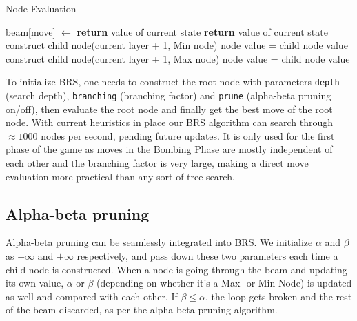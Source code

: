 \documentclass[a4paper,12pt]{article}
\begin{document}
    \begin{algorithm}[H]
        \caption{Node Evaluation}
        \begin{algorithmic}
            \Statex
            \State beam[move] $\gets$ 
            \Statex
            \State \textbf{return} value of current state
            \Statex
            \State \textbf{return} value of current state
            \Statex
            \State construct child node(current layer + 1, Min node)
            \State {}
            \State node value = child node value
            \EndIf
            \EndFor
            \Statex
            \State construct child node(current layer + 1, Max node)
            \State {}
            \State node value = child node value
            \EndIf
            \EndFor
            \EndIf
            \EndFunction
        \end{algorithmic}
    \end{algorithm}
    
    To initialize BRS, one needs to construct the root node with parameters \texttt{depth} (search depth), \texttt{branching} (branching factor) and \texttt{prune} (alpha-beta pruning on/off), then evaluate the root node and finally get the best move of the root node. With current heuristics in place our BRS algorithm can search through $\approx 1000$ nodes per second, pending future updates. It is only used for the first phase of the game as moves in the Bombing Phase are mostly independent of each other and the branching factor is very large, making a direct move evaluation more practical than any sort of tree search.
    
    \subsection{Alpha-beta pruning}
    Alpha-beta pruning can be seamlessly integrated into BRS. We initialize $\alpha$ and $\beta$ as $-\infty$ and $+\infty$ respectively, and pass down these two parameters each time a child node is constructed. When a node is going through the beam and updating its own value, $\alpha$ or $\beta$ (depending on whether it's a Max- or Min-Node) is updated as well and compared with each other. If $\beta \leq \alpha$, the loop gets broken and the rest of the beam discarded, as per the alpha-beta pruning algorithm.
    
\end{document}
